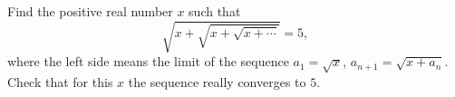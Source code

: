 Find the positive real number $x$ such that
\[
\sqrt{x+\sqrt{x+\sqrt{x+\cdots}}}=5,
\]
where the left side means the limit of the sequence $a_1=\sqrt x$, $a_{n+1}=\sqrt{x+a_n}$. Check that for this $x$ the sequence really converges to $5$.
